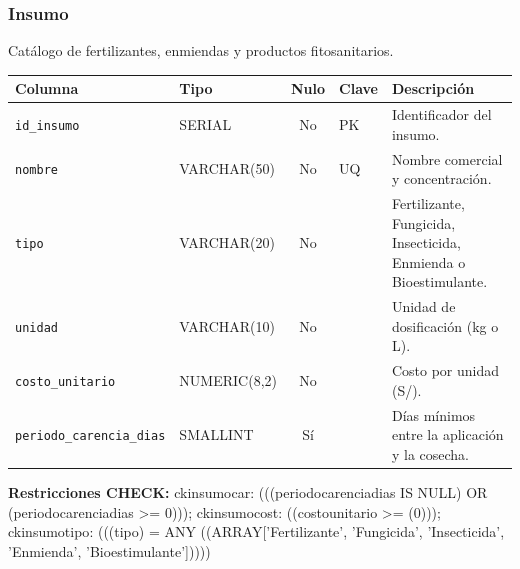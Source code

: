 \documentclass[11pt,letterpaper]{article}
\newcommand{\tbus}{\textunderscore\allowbreak}
\newcommand{\tb}[1]{{\ttfamily\let\_\tbus #1}}
\begin{document}
\subsubsection*{Insumo}
Catálogo de fertilizantes, enmiendas y productos fitosanitarios.
{\footnotesize
\begin{longtable}{>{\raggedright\arraybackslash}p{3.3cm}>{\raggedright\arraybackslash}p{2.5cm}c>{\raggedright\arraybackslash}p{2.2cm}>{\raggedright\arraybackslash}p{6.1cm}}
\toprule
\textbf{Columna} & \textbf{Tipo} & \textbf{Nulo} & \textbf{Clave} & \textbf{Descripción} \\
\midrule
\endhead
\texttt{id\_insumo} & SERIAL & No & PK & Identificador del insumo. \\
\texttt{nombre} & VARCHAR(50) & No & UQ & Nombre comercial y concentración. \\
\texttt{tipo} & VARCHAR(20) & No &  & Fertilizante, Fungicida, Insecticida, Enmienda o Bioestimulante. \\
\texttt{unidad} & VARCHAR(10) & No &  & Unidad de dosificación (kg o L). \\
\texttt{costo\_unitario} & NUMERIC(8,2) & No &  & Costo por unidad (S/). \\
\texttt{periodo\_carencia\_dias} & SMALLINT & Sí &  & Días mínimos entre la aplicación y la cosecha. \\
\bottomrule
\end{longtable}}
{\footnotesize\textbf{Restricciones CHECK:} \tb{ck\_insumo\_car}: \tb{(((periodo\_carencia\_dias IS NULL) OR (periodo\_carencia\_dias >= 0)))}; \tb{ck\_insumo\_cost}: \tb{((costo\_unitario >= (0)))}; \tb{ck\_insumo\_tipo}: \tb{(((tipo) = ANY ((ARRAY['Fertilizante', 'Fungicida', 'Insecticida', 'Enmienda', 'Bioestimulante']))))}\par}
\medskip
\end{document}
